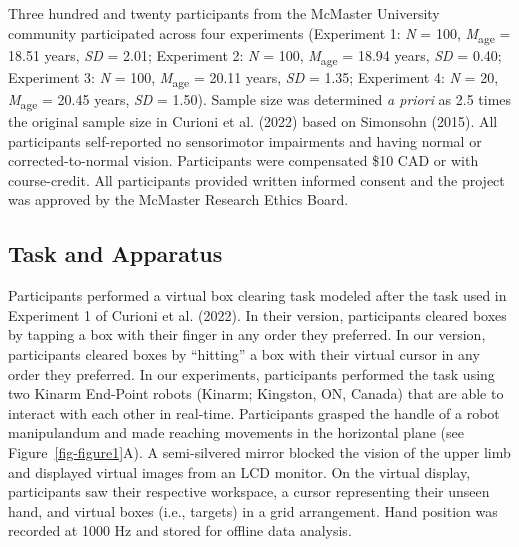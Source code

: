 \documentclass[
  11pt,
  letterpaper,
]{article}
\renewcommand{\emph}[1]{\textit{#1}}  %
\begin{document}
Three hundred and twenty participants from the McMaster University
community participated across four experiments (Experiment 1: \emph{N} =
100, \emph{M}\textsubscript{age} = 18.51 years, \emph{SD} = 2.01;
Experiment 2: \emph{N} = 100, \emph{M}\textsubscript{age} = 18.94 years,
\emph{SD} = 0.40; Experiment 3: \emph{N} = 100,
\emph{M}\textsubscript{age} = 20.11 years, \emph{SD} = 1.35; Experiment
4: \emph{N} = 20, \emph{M}\textsubscript{age} = 20.45 years, \emph{SD} =
1.50). Sample size was determined \emph{a priori} as 2.5 times the
original sample size in Curioni et al. (2022) based on Simonsohn (2015).
All participants self-reported no sensorimotor impairments and having
normal or corrected-to-normal vision. Participants were compensated \$10
CAD or with course-credit. All participants provided written informed
consent and the project was approved by the McMaster Research Ethics
Board.

\subsection{Task and Apparatus}\label{task-and-apparatus}

Participants performed a virtual box clearing task modeled after the
task used in Experiment 1 of Curioni et al. (2022). In their version,
participants cleared boxes by tapping a box with their finger in any
order they preferred. In our version, participants cleared boxes by
``hitting'' a box with their virtual cursor in any order they preferred.
In our experiments, participants performed the task using two Kinarm
End-Point robots (Kinarm; Kingston, ON, Canada) that are able to
interact with each other in real-time. Participants grasped the handle
of a robot manipulandum and made reaching movements in the horizontal
plane (see Figure~\ref{fig-figure1}A). A semi-silvered mirror blocked
the vision of the upper limb and displayed virtual images from an LCD
monitor. On the virtual display, participants saw their respective
workspace, a cursor representing their unseen hand, and virtual boxes
(i.e., targets) in a grid arrangement. Hand position was recorded at
1000 Hz and stored for offline data analysis.

\clearpage
\end{document}
